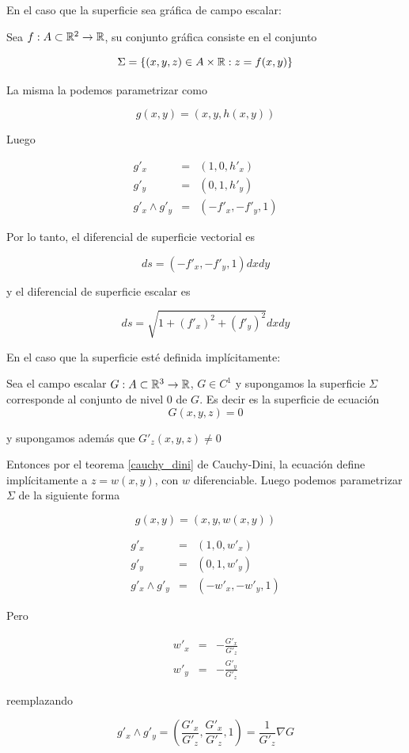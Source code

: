 En el caso que la superficie sea gráfica de campo escalar:

Sea $f: A \subset \mathbb{R}^2 \to \mathbb{R}$, su conjunto gráfica consiste en el conjunto 

$$ \Sigma = \{(x,y,z) \in A \times \mathbb{R} : z = f(x,y)\}$$

La misma la podemos parametrizar como 

$$ g(x,y) = (x,y, h(x,y)) $$

Luego

\begin{eqnarray*} g'_x &=& (1,0,h'_x) \\
g'_y &=& (0,1,h'_y) \\
g'_x \wedge g'_y &=& (-f'_x, -f'_y, 1) \end{eqnarray*}

Por lo tanto, el diferencial de superficie vectorial es

$$ ds = (-f'_x, -f'_y, 1)dxdy $$

y el diferencial de superficie escalar es

$$ ds = \sqrt{1 + (f'_x)^2 + (f'_y)^2 }dxdy $$


En el caso que la superficie esté definida implícitamente:

Sea el campo escalar $ G: A \subset \mathbb{R}^3 \to \mathbb{R}$, $ G \in C^1$ y supongamos la superficie $\Sigma$ corresponde al conjunto de nivel 0 de $G$.  Es decir es la superficie de ecuación 
$$G(x,y,z) = 0$$ 

y supongamos además que $G'_z(x,y,z) \neq 0$

Entonces por el teorema \ref{cauchy_dini} de Cauchy-Dini, la ecuación define implícitamente a $z = w(x,y)$, con $w$ diferenciable.  Luego podemos parametrizar $\Sigma$ de la siguiente forma

$$ g(x,y) = (x,y, w(x,y) )$$

\begin{eqnarray*} g'_x &=& (1,0, w'_x) \\
g'_y &=& (0,1, w'_y) \\
g'_x \wedge g'_y &=& (-w'_x, -w'_y, 1) \end{eqnarray*}

Pero

\begin{eqnarray*} w'_x &=& - \frac{G'_x}{G'_z} \\
w'_y &=& - \frac{G'_y}{G'_z} \end{eqnarray*}

reemplazando

$$ g'_x \wedge g'_y = (\frac{G'_x}{G'_z}, \frac{G'_x}{G'_z}, 1) = \frac{1}{G'_z}\nabla G$$

